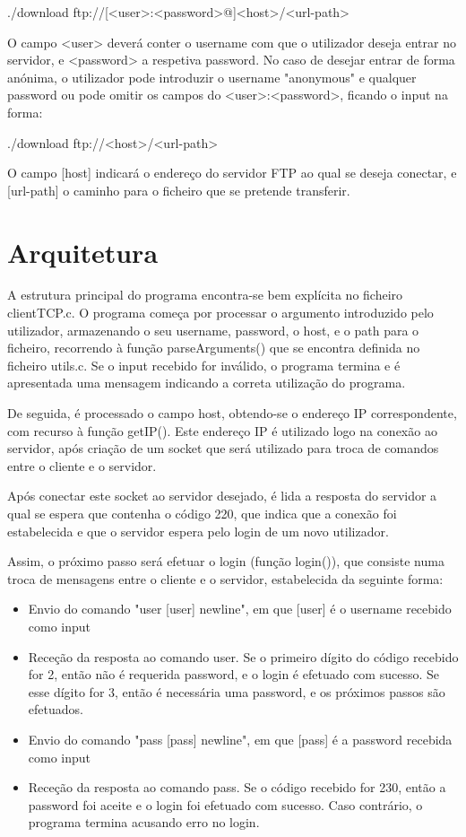 \documentclass[article, a4paper, 11pt, oneside]{memoir}
\begin{document}
./download ftp://[\textless user\textgreater :\textless password\textgreater @]\textless host\textgreater/\textless url-path\textgreater{}

O campo \textless user\textgreater{} deverá conter o username com que o utilizador deseja entrar no servidor, e \textless password\textgreater{} a respetiva password.
No caso de desejar entrar de forma anónima, o utilizador pode introduzir o username "anonymous" e qualquer password ou
pode omitir os campos do \textless user\textgreater :\textless password\textgreater{}, ficando o input na forma:

./download ftp://\textless host\textgreater /\textless url-path\textgreater{}

O campo [host] indicará o endereço do servidor FTP ao qual se deseja conectar, e [url-path] o caminho para o ficheiro que se pretende transferir.

\section{Arquitetura}

A estrutura principal do programa encontra-se bem explícita no ficheiro clientTCP.c.
O programa começa por processar o argumento introduzido pelo utilizador, armazenando o seu username,
password, o host, e o path para o ficheiro, recorrendo à função parseArguments() que se encontra definida no ficheiro utils.c.
Se o input recebido for inválido, o programa termina e é apresentada uma mensagem indicando a correta utilização do programa.

De seguida, é processado o campo host, obtendo-se o endereço IP correspondente, com recurso à função getIP().
Este endereço IP é utilizado logo na conexão ao servidor, após criação de um socket que será utilizado
para troca de comandos entre o cliente e o servidor.

Após conectar este socket ao servidor desejado, é lida a resposta do servidor a qual se espera que contenha o código 220,
que indica que a conexão foi estabelecida e que o servidor espera pelo login de um novo utilizador. 

Assim, o próximo passo será efetuar o login (função login()), que consiste numa troca de mensagens entre o cliente e o servidor,
estabelecida da seguinte forma:

\begin{itemize}
  \item Envio do comando "user [user] newline", em que [user] é o username recebido como input
  \item Receção da resposta ao comando user. Se o primeiro dígito do código recebido for 2, então não é requerida password, e o login é efetuado com sucesso. Se esse dígito for 3, então é necessária uma password, e os próximos passos são efetuados.
  \item Envio do comando "pass [pass] newline", em que [pass] é a password recebida como input
  \item Receção da resposta ao comando pass. Se o código recebido for 230, então a password foi aceite e o login foi efetuado com sucesso. Caso contrário, o programa termina acusando erro no login.
\end{itemize}
\end{document}
